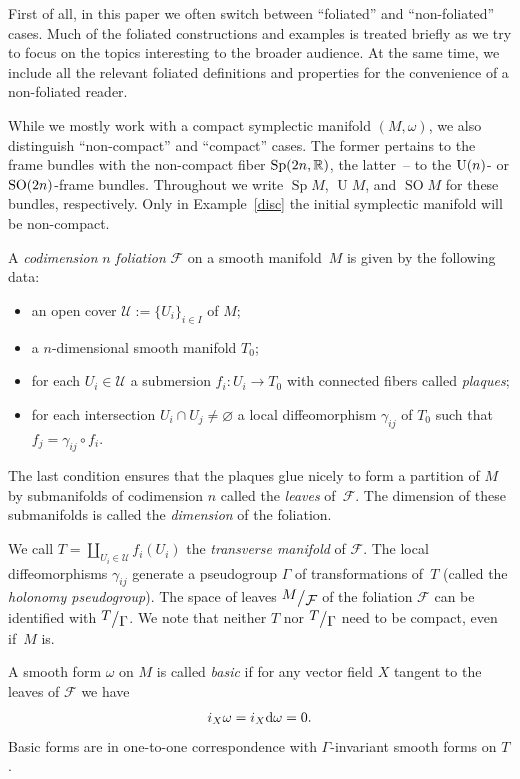 \documentclass[10pt,a4paper]{amsart}
\numberwithin{equation}{section}
\newcommand{\bigslant}[2]{{\raisebox{.2em}{$#1$}\big/\raisebox{-.2em}{$#2$}}}
\begin{document}
First of all, in this paper we often switch between ``foliated'' and ``non-foliated'' cases. Much of the foliated constructions and examples is treated briefly as we try to focus on the topics interesting to the broader audience. At the same time, we include all the relevant foliated definitions and properties for the convenience of a non-foliated reader.

While we mostly work with a compact symplectic manifold $(M,\omega)$, we also distinguish ``non-compact'' and ``compact'' cases. The former pertains to the frame bundles with the non-compact fiber ${\rm Sp}(2n,\mathbb{R})$, the latter~-- to the ${\rm U}(n)$- or ${\rm SO}(2n)$-frame bundles. Throughout we write $\operatorname{Sp} M$, $\operatorname{U} M$, and $\operatorname{SO} M$ for these bundles, respectively. Only in Example~\ref{disc} the initial symplectic manifold will be non-compact.
\begin{Definition} \label{fol}
A \emph{codimension} $n$ \emph{foliation} $\mathcal{F}$ on a smooth manifold~$M$ is given by the following data:
\begin{itemize}\itemsep=0pt
\item an open cover $\mathcal{U}:=\{U_i\}_{i\in I}$ of $M$;
\item a $n$-dimensional smooth manifold $T_0$;
\item for each $U_i\in\mathcal{U}$ a submersion $f_i\colon U_i\longrightarrow T_0$ with connected fibers called \emph{plaques};
\item for each intersection $U_i\cap U_j\neq\varnothing$ a local diffeomorphism $\gamma_{ij}$ of $T_0$ such that $f_j=\gamma_{ij}\circ f_i$.
\end{itemize}
The last condition ensures that the plaques glue nicely to form a partition of $M$ by submanifolds of codimension $n$ called the \emph{leaves} of~$\mathcal{F}$. The dimension of these submanifolds is called the \emph{dimension} of the foliation.
\end{Definition}

We call $T=\coprod\limits_{U_i\in\mathcal{U}}f_i(U_i)$ the \emph{transverse manifold} of $\mathcal{F}$. The local diffeomorphisms $\gamma_{ij}$ generate a pseudogroup $\Gamma$ of transformations of~$T$ (called the \emph{holonomy pseudogroup}). The space of leaves $\bigslant{M}{\mathcal{F}}$ of the foliation $\mathcal{F}$ can be identified with $\bigslant{T}{\Gamma}$. We note that neither $T$ nor $\bigslant{T}{\Gamma}$ need to be compact, even if~$M$ is.
\begin{Definition}
A smooth form $\omega$ on $M$ is called \emph{basic} if for any vector field $X$ tangent to the leaves of $\mathcal{F}$ we have
\begin{gather*}
i_X\omega= i_X{\rm d}\omega= 0.
\end{gather*}
Basic forms are in one-to-one correspondence with $\Gamma$-invariant smooth forms on $T$.
\end{Definition}
\end{document}
